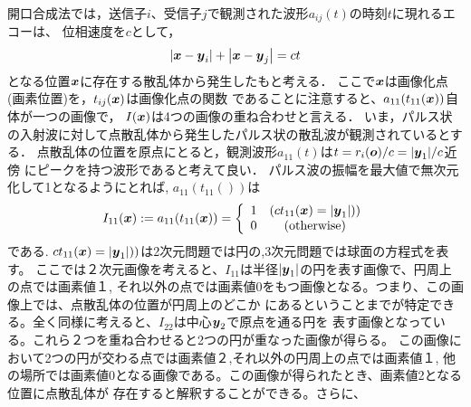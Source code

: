 \documentclass[10pt,a4j,dvipdfmx]{jarticle}
\begin{document}
開口合成法では，送信子$i$、受信子$j$で観測された波形$a_{ij}(t)$の時刻$t$に現れるエコーは、
位相速度を$c$として，
\begin{equation}
	\left| \mbox{\boldmath $x$} -\mbox{\boldmath $y$}_i\right|
	+
	\left| \mbox{\boldmath $x$} -\mbox{\boldmath $y$}_j\right|
	=ct
	\label{eqn:}
\end{equation}
となる位置$\mbox{\boldmath $x$}$に存在する散乱体から発生したもと考える．
ここで$\mbox{\boldmath $x$}$は画像化点(画素位置)を，$t_{ij}(\mbox{\boldmath $x$})$は画像化点の関数
であることに注意すると、$a_{11}(t_{11}(\mbox{\boldmath $x$}))$自体が一つの画像で，
$I(\mbox{\boldmath $x$})$は4つの画像の重ね合わせと言える．
いま，パルス状の入射波に対して点散乱体から発生したパルス状の散乱波が観測されているとする．
点散乱体の位置を原点にとると，観測波形$a_{11}(t)$は$t=r_i(\mbox{\boldmath $o$})/c=|\mbox{\boldmath $y$}_1|/c$近傍
にピークを持つ波形であると考えて良い．
パルス波の振幅を最大値で無次元化して1となるようにとれば,
$a_{11}(t_{11}())$は
\begin{equation}
	I_{11}(\mbox{\boldmath $x$}):=a_{11}(t_{11}(\mbox{\boldmath $x$}))=\left\{
	\begin{array}{cc}
		1 &  (ct_{11}(\mbox{\boldmath $x$})=|\mbox{\boldmath $y$}_1|))\\
		0 &  ({\rm otherwise})
	\end{array}
	\right.
	\label{eqn:}
\end{equation}
である. $ct_{11}(\mbox{\boldmath $x$})=|\mbox{\boldmath $y$}_1|))$は2次元問題では円の,3次元問題では球面の方程式を表す。
ここでは２次元画像を考えると、$I_11$は半径$|\mbox{\boldmath $y$}_1|$の円を表す画像で、円周上の点では画素値１,
それ以外の点では画素値0をもつ画像となる。つまり、この画像上では、点散乱体の位置が円周上のどこか
にあるということまでが特定できる。全く同様に考えると、$I_{22}$は中心$\mbox{\boldmath $y$}_2$で原点を通る円を
表す画像となっている。これら２つを重ね合わせると2つの円が重なった画像が得らる。 
この画像において2つの円が交わる点では画素値２,それ以外の円周上の点では画素値１,
他の場所では画素値0となる画像である。この画像が得られたとき、画素値2となる位置に点散乱体が
存在すると解釈することができる。さらに、
\end{document}

